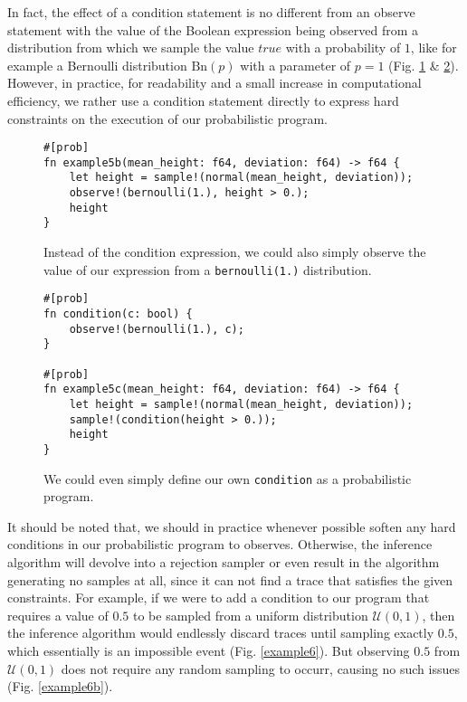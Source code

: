 In fact, the effect of a condition statement is no different from an observe statement with the value of the Boolean expression being observed from a distribution from which we sample the value $true$ with a probability of $1$, like for example a Bernoulli distribution $\text{Bn}(p)$ with a parameter of $p=1$ (Fig. \ref{example5b} \& \ref{example5c}). However, in practice, for readability and a small increase in computational efficiency, we rather use a condition statement directly to express hard constraints on the execution of our probabilistic program.

\begin{figure}[h]
\begin{lstlisting}
#[prob]
fn example5b(mean_height: f64, deviation: f64) -> f64 {
    let height = sample!(normal(mean_height, deviation));
    observe!(bernoulli(1.), height > 0.);
    height
}
\end{lstlisting}
\caption{Instead of the condition expression, we could also simply observe the value of our expression from a \lstinline{bernoulli(1.)} distribution.}
\label{example5b}
\end{figure}

\begin{figure}[h]
\begin{lstlisting}
#[prob]
fn condition(c: bool) {
    observe!(bernoulli(1.), c);
}

#[prob]
fn example5c(mean_height: f64, deviation: f64) -> f64 {
    let height = sample!(normal(mean_height, deviation));
    sample!(condition(height > 0.));
    height
}
\end{lstlisting}
\caption{We could even simply define our own \lstinline{condition} as a probabilistic program.}
\label{example5c}
\end{figure}

It should be noted that, we should in practice whenever possible soften any hard conditions in our probabilistic program to observes. Otherwise, the inference algorithm will devolve into a rejection sampler or even result in the algorithm generating no samples at all, since it can not find a trace that satisfies the given constraints. For example, if we were to add a condition to our program that requires a value of $0.5$ to be sampled from a uniform distribution $\mathcal{U}(0,1)$, then the inference algorithm would endlessly discard traces until sampling exactly $0.5$, which essentially is an impossible event (Fig. \ref{example6}). But observing $0.5$ from $\mathcal{U}(0,1)$ does not require any random sampling to occurr, causing no such issues (Fig. \ref{example6b}).

